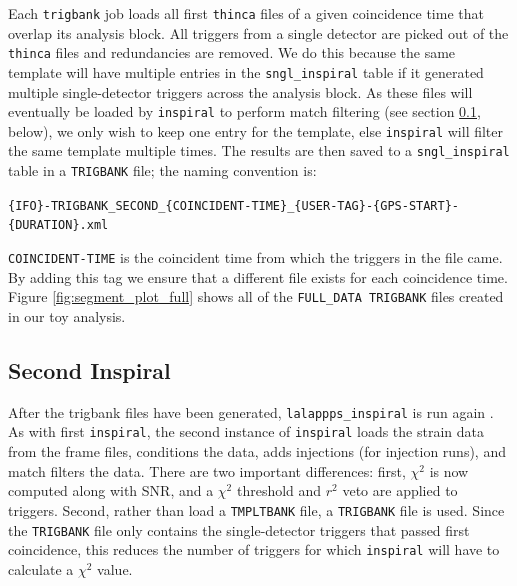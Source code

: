Each \texttt{trigbank} job loads all first \texttt{thinca} files of a given
coincidence time that overlap its analysis block. All triggers from a single
detector are picked out of the \texttt{thinca} files and redundancies are
removed. We do this because the same template will have multiple entries in the
\texttt{sngl\_inspiral} table if it generated multiple single-detector triggers
across the analysis block. As these files will eventually be loaded by
\texttt{inspiral} to perform match filtering (see section
\ref{sec:second_inspiral}, below), we only wish to keep one entry for the
template, else \texttt{inspiral} will filter the same template multiple times.
The results are then saved to a \texttt{sngl\_inspiral} table in a
\texttt{TRIGBANK} file; the naming convention is:
\begin{center}
\texttt{\{IFO\}-TRIGBANK\_SECOND\_\{COINCIDENT-TIME\}\_\{USER-TAG\}-\{GPS-START\}-\{DURATION\}.xml}
\end{center}
\texttt{COINCIDENT-TIME} is the coincident time from which the triggers in the file
came. By adding this tag we ensure that a different file exists for each
coincidence time. Figure \ref{fig:segment_plot_full} shows all of the
\texttt{FULL\_DATA TRIGBANK} files created in our toy analysis.

\subsection{Second Inspiral}
\label{sec:second_inspiral}

After the trigbank files have been generated, \texttt{lalappps\_inspiral} is
run again \cite{brown-2005-22}. As with first \texttt{inspiral}, the second
instance of \texttt{inspiral} loads the strain data from the frame files,
conditions the data, adds injections (for injection runs), and match filters
the data. There are two important differences: first, $\chi^2$ is now computed
along with \ac{SNR}, and a $\chi^2$ threshold and $r^2$ veto are applied to
triggers.  Second, rather than load a \texttt{TMPLTBANK} file, a
\texttt{TRIGBANK} file is used. Since the \texttt{TRIGBANK} file only contains
the single-detector triggers that passed first coincidence, this reduces the
number of triggers for which \texttt{inspiral} will have to calculate a
$\chi^2$ value.

